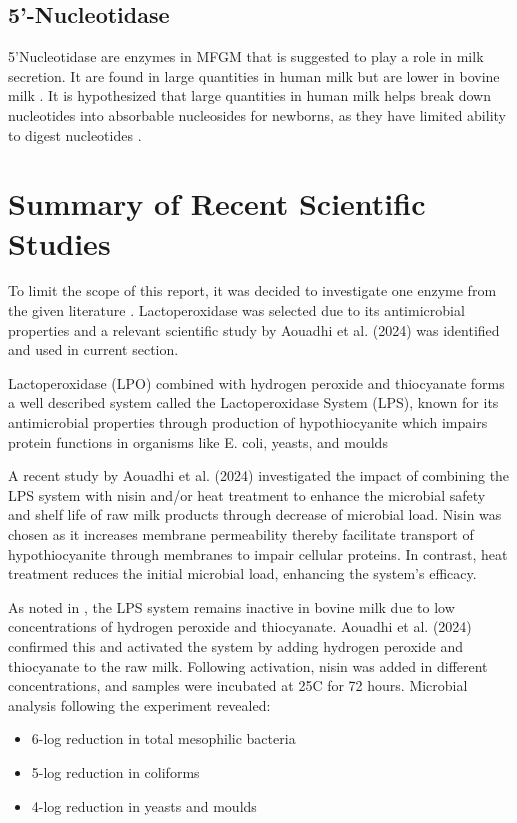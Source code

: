 \subsection*{5'-Nucleotidase}
5'Nucleotidase are enzymes in MFGM that is suggested to play a role in milk secretion. It are found in large quantities in human milk but are lower in bovine milk \cite*{RM_01}. It is hypothesized that large quantities in human milk helps break down nucleotides into absorbable nucleosides for newborns, as they have limited ability to digest nucleotides \cite*{RM_01}.

\section{Summary of Recent Scientific Studies}
To limit the scope of this report, it was decided to investigate one enzyme from the given literature \cite*{RM_01}. Lactoperoxidase was selected due to its antimicrobial properties and a relevant scientific study by Aouadhi et al. (2024) was identified and used in current section. 

\vline

Lactoperoxidase (LPO) combined with hydrogen peroxide and thiocyanate forms a well described system called the Lactoperoxidase System (LPS), known for its antimicrobial properties through production of hypothiocyanite which impairs protein functions in organisms like E. coli, yeasts, and moulds \cite*{RM_02}

\vline

A recent study by Aouadhi et al. (2024) investigated the impact of combining the LPS system with nisin and/or heat treatment to enhance the microbial safety and shelf life of raw milk products through decrease of microbial load. 
Nisin was chosen as it increases membrane permeability thereby facilitate transport of hypothiocyanite through membranes to impair cellular proteins. In contrast, heat treatment reduces the initial microbial load, enhancing the system's efficacy.

\vline

As noted in \cite*{RM_01}, the LPS system remains inactive in bovine milk due to low concentrations of hydrogen peroxide and thiocyanate. Aouadhi et al. (2024) confirmed this and activated the system by adding hydrogen peroxide and thiocyanate to the raw milk. Following activation, nisin was added in different concentrations, and samples were incubated at 25\textdegree C for 72 hours. Microbial analysis following the experiment revealed:
\begin{itemize}
    \item 6-log reduction in total mesophilic bacteria
    \item 5-log reduction in coliforms
    \item 4-log reduction in yeasts and moulds
\end{itemize}


